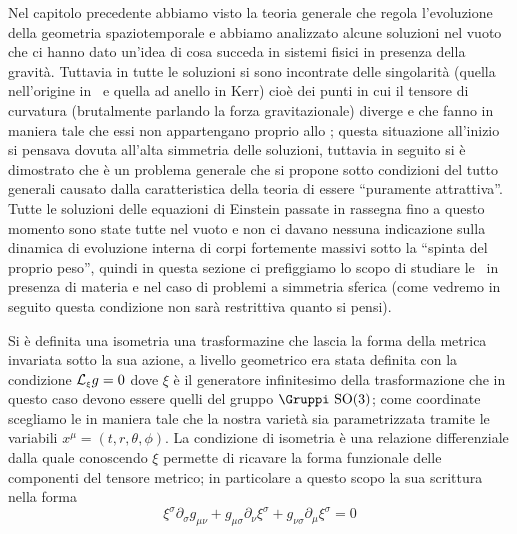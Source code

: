 %
%
%
Nel capitolo precedente abbiamo visto la teoria generale che regola l'evoluzione della geometria spa\-zio\-tem\-po\-ra\-le e abbiamo analizzato alcune soluzioni nel vuoto che ci hanno dato un'idea di cosa succeda in sistemi fisici in presenza della gravit\`a. Tuttavia in tutte le soluzioni si sono incontrate delle singolarit\`a (quella nell'origine in \Sch\ e quella ad anello in Kerr) cio\`e dei punti in cui il tensore di curvatura (brutalmente parlando la forza gravitazionale) diverge e che fanno in maniera tale che essi non appartengano proprio allo \ST; questa situazione all'inizio si pensava dovuta all'alta simmetria delle soluzioni, tuttavia in seguito si \`e dimostrato che \`e un problema generale che si propone sotto condizioni del tutto generali causato dalla caratteristica della teoria di essere ``puramente attrattiva''.
%
%
%
Tutte le soluzioni delle equazioni di Einstein passate in rassegna fino a questo momento sono state tutte nel vuoto e non ci davano nessuna indicazione sulla dinamica di evoluzione interna di corpi fortemente massivi sotto la ``spinta del proprio peso'', quindi in questa sezione ci prefiggiamo lo scopo di studiare le \EqEi\ in presenza di materia e nel caso di problemi a simmetria sferica (come vedremo in seguito questa condizione non sar\`a restrittiva quanto si pensi).\par
Si \`e definita una isometria una trasformazine che lascia la forma della metrica invariata sotto la sua azione, a livello geometrico era stata definita con la condizione ${\cal L}_{\scriptscriptstyle\xi}{g}=0$ dove $\xi$ \`e il generatore infinitesimo della trasformazione che in questo caso devono essere quelli del gruppo $\hbox{\Gruppi SO}(3)$; come coordinate scegliamo le  in maniera tale che la nostra variet\`a sia parametrizzata tramite le variabili $x^\mu=(t,r,\theta,\phi)$. La condizione di isometria \`e una relazione differenziale dalla quale conoscendo $\xi$ permette di ricavare la forma funzionale delle componenti del tensore metrico; in particolare a questo scopo la sua scrittura nella forma
$$
\xi^\sigma\partial_\sigma g_{\mu\nu}+g_{\mu\sigma}\partial_\nu\xi^\sigma+g_{\nu\sigma}\partial_\mu\xi^\sigma=0
$$
